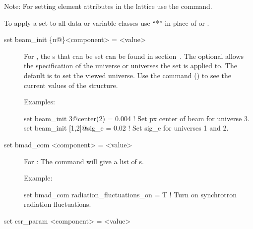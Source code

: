 {{\vskip 0.2in 

Note: For setting element attributes in the 
lattice use the  command.

To apply a set to all data or variable classes use ``*''
in place of  or .



\begin{description}

\item[set beam\_init \{n@\}<component> = <value>] \Newline

\vskip -0.2in

For , the s that can be set can be
found in section~. The optional  allows the
specification of the universe or universes the set is applied to. The
default is to set the viewed universe. Use the  command
() to see the current values of the 
structure.

Examples:
\begin{example}
  set beam_init 3@center(2) = 0.004  ! Set px center of beam for universe 3.
  set beam_init [1,2]@sig_e = 0.02   ! Set sig_e for universes 1 and 2.
\end{example}


\item[set bmad_com <component> = <value>] \Newline

\vskip -0.2in

For : The  command will give a list of 
s.

Example:
\begin{example}
  set bmad_com radiation_fluctuations_on = T ! Turn on synchrotron radiation fluctuations.
\end{example}


\item[set csr_param <component> = <value>] \Newline

\vskip -0.2in


\end{description}}}
